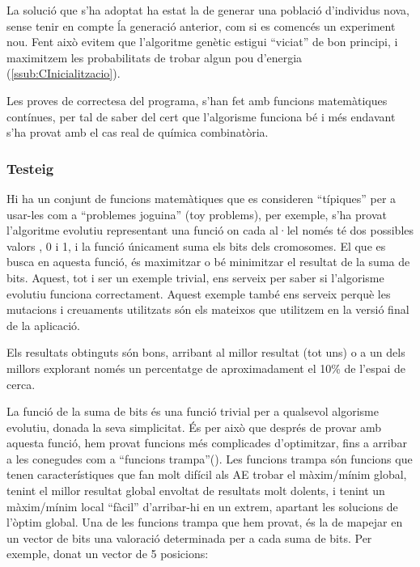 La solució que s'ha adoptat ha estat la de generar una població d'individus
nova, sense tenir en compte ĺa generació anterior, com si es comencés un
experiment nou.  Fent això evitem que l'algoritme genètic estigui ``viciat'' de
bon principi, i maximitzem les probabilitats de trobar algun pou d'energia
(\ref{ssub:CInicialitzacio}).

Les proves de correctesa del programa, s'han fet amb funcions matemàtiques
contínues, per tal de saber del cert que l'algorisme funciona bé i més endavant
s'ha provat amb el cas real de química combinatòria.


\subsubsection{Testeig} %
\label{ssub:Testeig}

Hi ha un conjunt de funcions matemàtiques que es consideren ``típiques'' per a
usar-les com a ``problemes joguina'' (toy problems), per exemple, s'ha provat
l'algoritme evolutiu representant una funció on cada al·lel només té dos
possibles valors , 0 i 1, i la funció únicament suma els bits dels cromosomes.
El que es busca en aquesta funció, és maximitzar o bé minimitzar el resultat de
la suma de bits.  Aquest, tot i ser un exemple trivial, ens serveix per
saber si l'algorisme evolutiu funciona correctament.  Aquest exemple també ens
serveix perquè les mutacions i creuaments utilitzats són els mateixos que
utilitzem en la versió final de la aplicació.

Els resultats obtinguts són bons, arribant al millor resultat (tot uns) o a un
dels millors explorant només un percentatge de aproximadament el  10\% de
l'espai de cerca.

La funció de la suma de bits és una funció trivial per a qualsevol algorisme
evolutiu, donada la seva simplicitat.  És per això que després de provar amb
aquesta funció, hem provat funcions més complicades d'optimitzar, fins a arribar a
les conegudes com a ``funcions trampa''(\cite{EU2009}).  Les funcions trampa són funcions que
tenen característiques que fan molt difícil als AE trobar el màxim/mínim global,
tenint el millor resultat global envoltat de resultats molt dolents, i tenint un
màxim/mínim local ``fàcil'' d'arribar-hi en un extrem, apartant les solucions de
l'òptim global.  Una de les funcions trampa que hem provat, és la de mapejar en
un vector de bits una valoració determinada per a cada suma de bits.  Per
exemple, donat un vector de 5 posicions:

